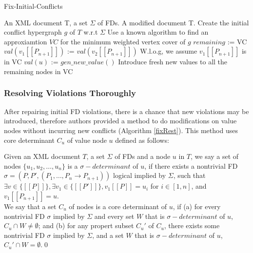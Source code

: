 \begin{algorithm}
\caption{Fix-Initial-Conflicts}
\label{fixInit}
\begin{algorithmic}[1]
\REQUIRE An XML document T, a set $\Sigma$ of FDs.
\ENSURE A modified document T.
\STATE Create the initial conflict hypergraph $g$ of $T$ w.r.t $\Sigma$
\STATE Use a known algorithm to find an approxiamtion $VC$ for the minimum weighted vertex cover of $g$
\STATE $remaining$ := VC
\STATE $val(v_1[\![P_{n+1}]\!])$ := $val(v_2[\![P_{n+1}]\!])$ \COMMENT W.l.o.g, we assume $v_1[\![P_{n+1}]\!]$ is in VC
\ENDWHILE
{}
\STATE $val(u)$ := $gen\_new\_value()$
\STATE \COMMENT Introduce fresh new values to all the remaining nodes in VC
\ENDFOR
\end{algorithmic}
\end{algorithm}

\subsubsection{Resolving Violations Thoroughly}

After repairing initial FD violations, there is a chance that new violations may be introduced, therefore authors provided a method to do modifications on value nodes without incurring new conflicts (Algorithm \ref{fixRest}). This method uses core determinant $C_u$ of value node $u$ defined as follows:

\begin{define}
Given an XML document $T$, a set $\Sigma$ of FDs and a node $u$ in $T$, we say a set of nodes $\{u_1, u_2, \dots, u_n\}$ is a $\sigma\!-\!determinant$ of $u$, if there exists a nontrivial FD $\sigma = (P, P', (P_1, \dots, P_n \rightarrow P_{n+1}))$ logical implied by $\Sigma$, such that $\exists v \in \{[\![P]\!]\}, \exists v_1 \in \{[\![P']\!]\}, v_1[\![P]\!] = u_i$ for $i \in [1,n]$, and $v_1[\![P_{n+1}]\!] = u$.\\
We say that a set $C_u$ of nodes is a core determinant of $u$, if (a) for every nontrivial FD $\sigma$ implied by $\Sigma$ and every set $W$ that is $\sigma\!-\!determinant$ of $u$, $C_u \cap W \neq \emptyset$; and (b) for any propert subset $C_u'$ of $C_u$, there exists some nontrivial FD $\sigma$ implied by $\Sigma$, and a set $W$ that is $\sigma\!-\!determinant$ of $u$, $C_u' \cap W = \emptyset$.\qed
\end{define}

